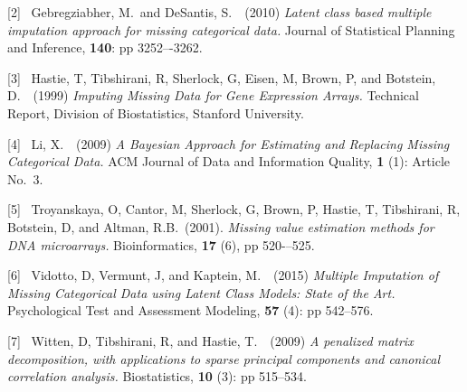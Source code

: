 \documentclass{article}
\begin{document}
[2] \ Gebregziabher, M.~and DeSantis, S.\ \ (2010) {\it Latent class based multiple imputation approach for missing categorical data.}  Journal of Statistical Planning and Inference, {\bf 140}: pp 3252–-3262.

[3] \ Hastie, T, Tibshirani, R, Sherlock, G, Eisen, M, Brown, P, and Botstein, D.\ \ (1999) {\it Imputing Missing Data for Gene Expression Arrays.} Technical Report, Division of Biostatistics, Stanford University.

[4] \ Li, X.\ \ (2009) {\it A Bayesian Approach for Estimating and Replacing Missing Categorical Data.}  ACM Journal of Data and Information Quality, {\bf 1} (1): Article No.~3.

[5] \ Troyanskaya, O, Cantor, M, Sherlock, G, Brown, P, Hastie, T, Tibshirani, R, Botstein, D, and Altman, R.B.\ (2001). {\it Missing value estimation methods for DNA microarrays.} Bioinformatics, {\bf 17} (6), pp 520-–525.

[6] \ Vidotto, D, Vermunt, J, and Kaptein, M.\ \ (2015) {\it Multiple Imputation of Missing Categorical Data using Latent Class Models: State of the Art.}  Psychological Test and Assessment Modeling, {\bf 57} (4): pp 542--576.

[7] \ Witten, D, Tibshirani, R, and Hastie, T.\ \ (2009) {\it A penalized matrix decomposition, with applications to sparse principal components and canonical correlation analysis.} Biostatistics, {\bf 10} (3): pp 515--534.
\end{document}

